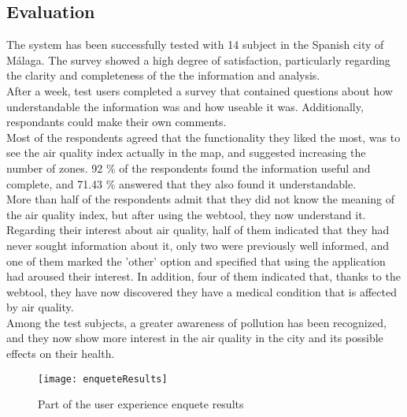 \subsection*{Evaluation}

The system has been successfully tested with 14 subject in the Spanish city of Málaga. The survey showed a high degree of satisfaction, 
particularly regarding the clarity and completeness of the the information and analysis.\\

After a week, test users completed a survey that contained questions about how understandable the information was
and how useable it was. Additionally, respondants could make their own comments.\\

Most of the respondents agreed that the functionality they liked the most, was to see the air quality index actually in the
map, and suggested increasing the number of zones.
92 \% of the respondents found the information useful and complete, and 71.43 \% answered that they also found it
understandable.\\

More than half of the respondents admit that they did not know the meaning of the air quality index, but after
using the webtool, they now understand it.\\

Regarding their interest about air quality, half of them indicated that they had never sought information about it,
only two were previously well informed, and one of them marked the 'other' option and specified that using the application had aroused their interest.
In addition, four of them indicated that, thanks to the webtool, they have now discovered they have a medical condition that is affected by air quality.\\

Among the test subjects, a greater awareness of pollution has been recognized, and they now show more interest in the
air quality in the city and its possible effects on their health.

\begin{figure}[ht]
   \centering
   \texttt{[image: enqueteResults]}
   \caption{Part of the user experience enquete results}
\end{figure}